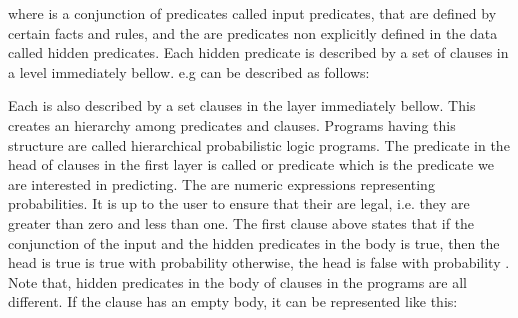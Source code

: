 \documentclass[letterpaper,10pt,english]{sphinxmanual}
\begin{document}
\begin{sphinxVerbatim}[commandchars=\\\{\}]
  
\end{sphinxVerbatim}

where  is a conjunction of predicates called input predicates, that are defined by certain facts and rules, and the  are predicates non explicitly defined in the data called hidden predicates. Each hidden predicate is described by a set of clauses in a level immediately bellow. e.g  can be described as follows:

\begin{sphinxVerbatim}[commandchars=\\\{\}]
  
  

  
\end{sphinxVerbatim}

Each  is also described by a set clauses in the layer immediately bellow. This creates an hierarchy among predicates and clauses. Programs having this structure are called hierarchical probabilistic logic programs. The predicate in the head of clauses in the first layer is called  or  predicate which is the predicate we are interested in predicting.
The  are numeric expressions representing probabilities.
It is up to the user to ensure that their are legal, i.e. they are greater than zero and less than one. The first clause above states that if the conjunction of the input and the hidden predicates in the body is true, then the head is true is true with probability  otherwise, the head is false with probability .  Note that, hidden predicates in the body of clauses in the programs are all different.
If the clause has an empty body, it can be represented like this:
\end{document}
